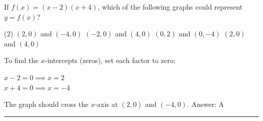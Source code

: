 \documentclass[11pt,paper=a4,answers]{exam}
\begin{document}
\begin{questions}
\question
If $f(x) = (x - 2)(x + 4)$, which of the following graphs could represent $y = f(x)$?
\begin{center}
\end{center}
\begin{tasks}(2)
    \task $(2, 0)$ and $(-4, 0)$
    \task $(-2, 0)$ and $(4, 0)$
    \task $(0, 2)$ and $(0, -4)$
    \task $(2, 0)$ and $(4, 0)$
\end{tasks}

\begin{solution}
To find the $x$-intercepts (zeros), set each factor to zero:
\vspace{5pt}
\begin{center}
$x - 2 = 0 \implies x = 2$ \\
$x + 4 = 0 \implies x = -4$
\end{center}
\vspace{5pt}
The graph should cross the $x$-axis at $(2, 0)$ and $(-4, 0)$.
\vspace{5pt}
Answer: \colorbox{yellow!100}{A}
\end{solution}


\end{questions}
\begin{center}
\rule{.5\textwidth}{1pt}
\end{center}
\end{document}
